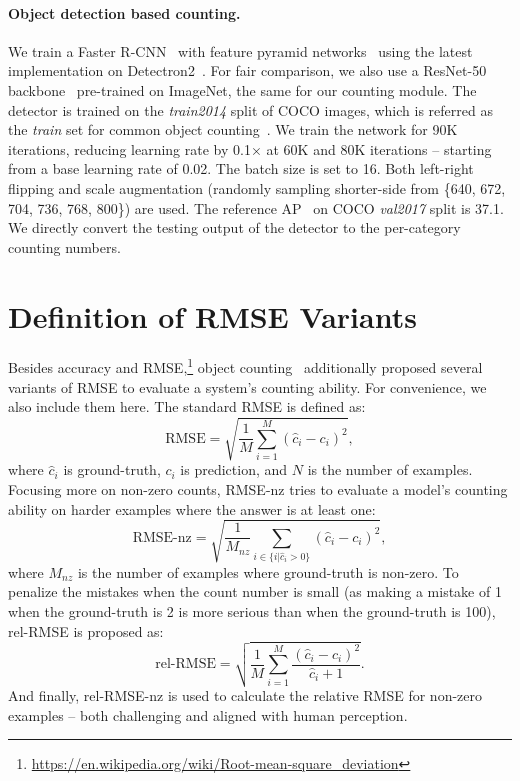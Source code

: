 \documentclass{article} \usepackage[dvipsnames,table]{xcolor}
\def\x{$\times$\xspace}
\begin{document}
\paragraph{Object detection based counting.} We train a Faster R-CNN~\cite{ren2015faster} with feature pyramid networks~\cite{lin2017feature} using the latest implementation on Detectron2~\cite{wu2019detectron2}. For fair comparison, we also use a ResNet-50 backbone~\cite{he2016deep} pre-trained on ImageNet, the same for our counting module. The detector is trained on the \emph{train2014} split of COCO images, which is referred as the \emph{train} set for common object counting~\cite{chattopadhyay2017counting}. We train the network for 90K iterations, reducing learning rate by 0.1\x at 60K and 80K iterations -- starting from a base learning rate of 0.02. The batch size is set to 16. Both left-right flipping and scale augmentation (randomly sampling shorter-side from \{640, 672, 704, 736, 768, 800\}) are used. The reference AP~\cite{ren2015faster} on COCO \emph{val2017} split is 37.1. We directly convert the testing output of the detector to the per-category counting numbers.

\section{Definition of RMSE Variants\label{sec:metrics}}

Besides accuracy and RMSE,\footnote{\url{https://en.wikipedia.org/wiki/Root-mean-square_deviation}} object counting~\cite{chattopadhyay2017counting} additionally proposed several variants of RMSE to evaluate a system's counting ability. For convenience, we also include them here. The standard RMSE is defined as:
\begin{equation}\label{eqn:rmse}
    \text{RMSE} = \sqrt{\frac{1}{M} \sum_{i=1}^{M} (\hat{c}_{i} - c_{i})^2},
\end{equation}
where $\hat{c}_i$ is ground-truth, $c_i$ is prediction, and $N$ is the number of examples. Focusing more on non-zero counts, RMSE-nz tries to evaluate a model's counting ability on harder examples where the answer is at least one:
\begin{equation}\label{eqn:rmse-nz}\textbf{}
    \text{RMSE-nz} = \sqrt{\frac{1}{M_{nz}} \sum_{i \in \{i | \hat{c}_i>0\}} (\hat{c}_{i} - c_{i})^2},
\end{equation}
where $M_{nz}$ is the number of examples where ground-truth is non-zero. To penalize the mistakes when the count number is small (as making a mistake of 1 when the ground-truth is 2 is more serious than when the ground-truth is 100), rel-RMSE is proposed as:
\begin{equation}\label{eqn:rel-rmse}
    \text{rel-RMSE} = \sqrt{\frac{1}{M} \sum_{i=1}^{M} \frac{(\hat{c}_{i} - c_{i})^2}{\hat{c}_{i} + 1}}.
\end{equation}
And finally, rel-RMSE-nz is used to calculate the relative RMSE for non-zero examples -- both challenging and aligned with human perception.
\end{document}
